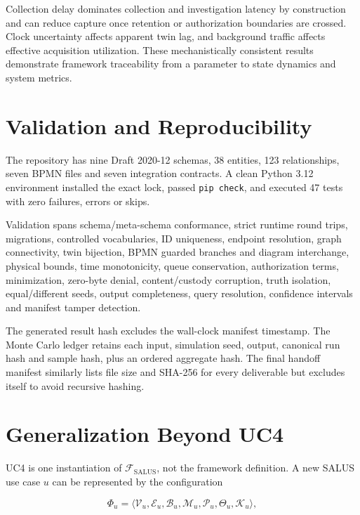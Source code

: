 ﻿\documentclass[10pt,a4paper,twocolumn]{article}
\newcommand{\Framework}{\mathcal{F}_{\mathrm{SALUS}}}
\newcommand{\code}[1]{\texttt{#1}}
\begin{document}
Collection delay dominates collection and investigation latency by construction and can reduce capture once retention or authorization boundaries are crossed. Clock uncertainty affects apparent twin lag, and background traffic affects effective acquisition utilization. These mechanistically consistent results demonstrate framework traceability from a parameter to state dynamics and system metrics.

\section{Validation and Reproducibility}

The repository has nine Draft 2020-12 schemas, 38 entities, 123 relationships, seven BPMN files and seven integration contracts. A clean Python 3.12 environment installed the exact lock, passed \code{pip check}, and executed 47 tests with zero failures, errors or skips.

Validation spans schema/meta-schema conformance, strict runtime round trips, migrations, controlled vocabularies, ID uniqueness, endpoint resolution, graph connectivity, twin bijection, BPMN guarded branches and diagram interchange, physical bounds, time monotonicity, queue conservation, authorization terms, minimization, zero-byte denial, content/custody corruption, truth isolation, equal/different seeds, output completeness, query resolution, confidence intervals and manifest tamper detection.

The generated result hash excludes the wall-clock manifest timestamp. The Monte Carlo ledger retains each input, simulation seed, output, canonical run hash and sample hash, plus an ordered aggregate hash. The final handoff manifest similarly lists file size and SHA-256 for every deliverable but excludes itself to avoid recursive hashing.

\section{Generalization Beyond UC4}

UC4 is one instantiation of \(\Framework\), not the framework definition. A new SALUS use case \(u\) can be represented by the configuration

\begin{equation}
\Phi_u=\langle\mathcal{V}_u,\mathcal{E}_u,\mathcal{B}_u,\mathcal{M}_u,\mathcal{P}_u,\Theta_u,\mathcal{K}_u\rangle,
\end{equation}
\end{document}
